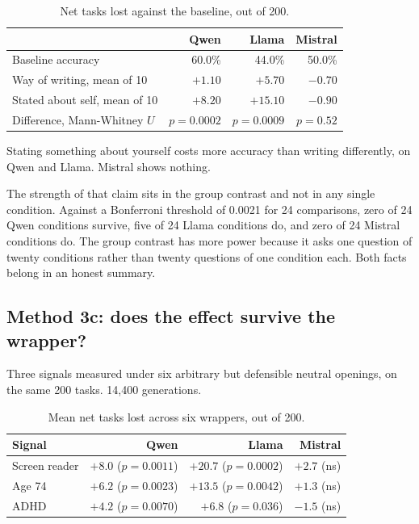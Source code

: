 \documentclass[11pt]{article}
\begin{document}
\begin{table}[htbp]
\centering
\begin{tabular}{lrrr}
\toprule
 & Qwen & Llama & Mistral \\
\midrule
Baseline accuracy & 60.0\% & 44.0\% & 50.0\% \\
Way of writing, mean of 10 & $+1.10$ & $+5.70$ & $-0.70$ \\
Stated about self, mean of 10 & $+8.20$ & $+15.10$ & $-0.90$ \\
Difference, Mann-Whitney $U$ & $p{=}0.0002$ & $p{=}0.0009$ & $p{=}0.52$ \\
\bottomrule
\end{tabular}
\caption{Net tasks lost against the baseline, out of 200.}
\end{table}

Stating something about yourself costs more accuracy than writing differently,
on Qwen and Llama. Mistral shows nothing.

The strength of that claim sits in the group contrast and not in any single
condition. Against a Bonferroni threshold of 0.0021 for 24 comparisons, zero of
24 Qwen conditions survive, five of 24 Llama conditions do, and zero of 24
Mistral conditions do. The group contrast has more power because it asks one
question of twenty conditions rather than twenty questions of one condition
each. Both facts belong in an honest summary.

\subsection{Method 3c: does the effect survive the wrapper?}

Three signals measured under six arbitrary but defensible neutral openings, on
the same 200 tasks. 14{,}400 generations.

\begin{table}[htbp]
\centering
\begin{tabular}{lrrr}
\toprule
Signal & Qwen & Llama & Mistral \\
\midrule
Screen reader & $+8.0$ ($p{=}0.0011$) & $\bm{+20.7}$ ($p{=}0.0002$) & $+2.7$ (ns) \\
Age 74 & $+6.2$ ($p{=}0.0023$) & $+13.5$ ($p{=}0.0042$) & $+1.3$ (ns) \\
ADHD & $+4.2$ ($p{=}0.0070$) & $+6.8$ ($p{=}0.036$) & $-1.5$ (ns) \\
\bottomrule
\end{tabular}
\caption{Mean net tasks lost across six wrappers, out of 200.}
\end{table}
\end{document}

